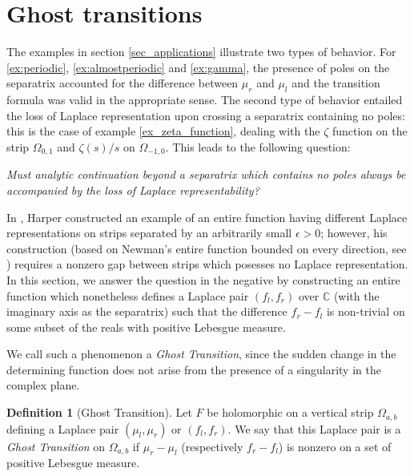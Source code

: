 \documentclass[12pt]{article}
\theoremstyle{definition}
\newtheorem{definition}[theorem]{Definition}
\begin{document}
\section{Ghost transitions}
\label{sec_ghosts}


The examples in section \ref{sec_applications} illustrate two types of behavior. For \ref{ex:periodic}, \ref{ex:almostperiodic} and \ref{ex:gamma}, the presence of poles on the separatrix accounted for the difference between $\mu_r$ and $\mu_l$ and the transition formula was valid in the appropriate sense. The second type of behavior entailed the loss of Laplace representation upon crossing a separatrix containing no poles: this is the case of example \ref{ex_zeta_function}, dealing with the $\zeta$ function on the strip $\Omega_{0,1}$ and $\zeta(s)/s$ on $\Omega_{-1,0}.$ This leads to the following question:

\emph{Must analytic continuation beyond a separatrix which contains no poles always be accompanied by the loss of Laplace representability?}


In \cite{Harper}, Harper constructed an example of an entire function having different Laplace representations on strips separated by an arbitrarily small $\epsilon > 0$; however, his construction (based on Newman's entire function bounded on every direction, see \cite{Newman}) requires a nonzero gap between strips which posesses no Laplace representation.
In this section, we answer the question in the negative by constructing an entire function which nonetheless defines a Laplace pair \( (f_l, f_r) \) over \(\mathbb{C} \) (with the imaginary axis as the separatrix) such that the difference \(f_r-f_l\) is non-trivial on some subset of the reals with positive Lebesgue measure. 




We call such a phenomenon a {\em Ghost Transition}, since the sudden change in the determining function does not arise from the presence of a singularity in the complex plane.

\begin{definition}[Ghost Transition]

Let $F$ be holomorphic on a vertical strip $\Omega_{a,b}$ defining a Laplace pair $(\mu_l,\mu_r)$ or $( f_l, f_r).$ We say that this Laplace pair is a {\em Ghost Transition} on $\Omega_{a,b}$ if $\mu_r-\mu_l$ (respectively $f_r-f_l$) is nonzero on a set of positive Lebesgue measure.
    
\end{definition}
\end{document}
